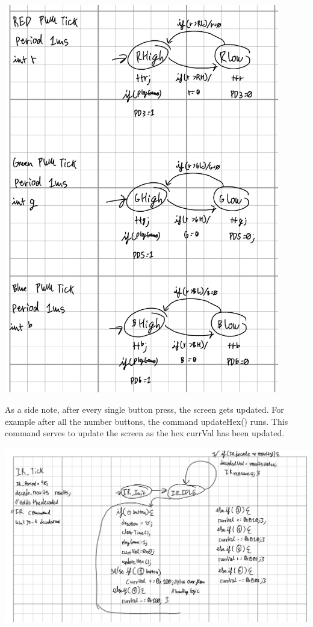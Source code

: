 \documentclass[12pt]{article}
\begin{document}
\pagebreak
    \includegraphics[width=0.9\textwidth]{PWMTicks.png}

\pagebreak
As a side note, after every single button press, the screen gets updated.
For example after all the number buttons, the command updateHex() runs.
This command serves to update the screen as the hex currVal has been updated.

\includegraphics[width=1.2\textwidth]{IRTick.png}


\end{document}
